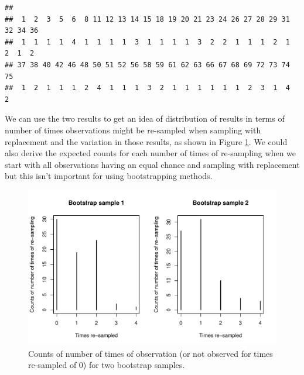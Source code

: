 \documentclass[]{book}
\newenvironment{Shaded}{\begin{snugshade}}{\end{snugshade}}
\newcommand{\KeywordTok}[1]{\textcolor[rgb]{0.13,0.29,0.53}{\textbf{#1}}}
\newcommand{\StringTok}[1]{\textcolor[rgb]{0.31,0.60,0.02}{#1}}
\newcommand{\OperatorTok}[1]{\textcolor[rgb]{0.81,0.36,0.00}{\textbf{#1}}}
\newcommand{\NormalTok}[1]{#1}
\theoremstyle{definition}
\theoremstyle{definition}
\theoremstyle{remark}
\begin{document}
\begin{Shaded}
\end{Shaded}

\begin{verbatim}
## 
##  1  2  3  5  6  8 11 12 13 14 15 18 19 20 21 23 24 26 27 28 29 31 32 34 36 
##  1  1  1  1  4  1  1  1  1  3  1  1  1  1  3  2  2  1  1  1  2  1  2  1  2 
## 37 38 40 42 46 48 50 51 52 56 58 59 61 62 63 66 67 68 69 72 73 74 75 
##  1  2  1  1  1  2  4  1  1  1  3  2  1  1  1  1  1  1  2  3  1  4  2
\end{verbatim}

We can use the two results to get an idea of distribution of results in
terms of number of times observations might be re-sampled when sampling
with replacement and the variation in those results, as shown in Figure
\ref{fig:Figure2-17}. We could also derive the expected counts for each
number of times of re-sampling when we start with all observations
having an equal chance and sampling with replacement but this isn't
important for using bootstrapping methods.




\begin{figure}
\centering
\includegraphics{02-reintroductionToStatistics_files/figure-latex/Figure2-17-1.pdf}
\caption{\label{fig:Figure2-17}Counts of number of times of observation (or not observed
for times re-sampled of 0) for two bootstrap samples.}
\end{figure}
\end{document}
